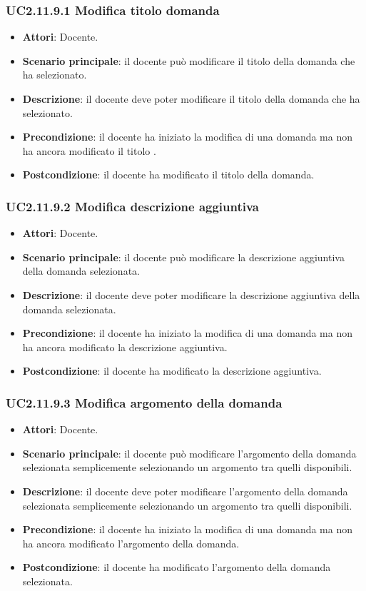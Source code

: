 \subsubsection{UC2.11.9.1 Modifica titolo domanda
}
\begin{itemize}
\item \textbf{Attori}: Docente.
\item \textbf{Scenario principale}: il docente può modificare il titolo della domanda che ha selezionato.
\item \textbf{Descrizione}: il docente deve poter modificare il titolo della domanda che ha selezionato.
\item \textbf{Precondizione}: il docente ha iniziato la modifica di una domanda ma non ha ancora modificato il titolo
.
\item \textbf{Postcondizione}: il docente ha modificato il titolo della domanda.
\end{itemize}
\subsubsection{UC2.11.9.2 Modifica descrizione aggiuntiva}
\begin{itemize}
\item \textbf{Attori}: Docente.
\item \textbf{Scenario principale}: il docente può modificare la descrizione aggiuntiva della domanda selezionata.
\item \textbf{Descrizione}: il docente deve poter modificare la descrizione aggiuntiva della domanda selezionata.
\item \textbf{Precondizione}: il docente ha iniziato la modifica di una domanda ma non ha ancora modificato la descrizione aggiuntiva.
\item \textbf{Postcondizione}: il docente ha modificato la descrizione aggiuntiva.
\end{itemize}
\subsubsection{UC2.11.9.3 Modifica argomento della domanda}
\begin{itemize}
\item \textbf{Attori}: Docente.
\item \textbf{Scenario principale}: il docente può modificare l'argomento della domanda selezionata semplicemente selezionando un argomento tra quelli disponibili.
\item \textbf{Descrizione}: il docente deve poter modificare l'argomento della domanda selezionata semplicemente selezionando un argomento tra quelli disponibili.
\item \textbf{Precondizione}: il docente ha iniziato la modifica di una domanda ma non ha ancora modificato l'argomento della domanda.
\item \textbf{Postcondizione}: il docente ha modificato l'argomento della domanda selezionata.
\end{itemize}
